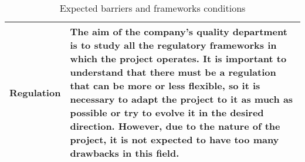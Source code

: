 \begin{table}[H]
\begin{tabular}{l p{12cm}}
		\midrule
		
		Regulation & The aim of the company's quality department is to study all the regulatory frameworks in which the project operates. It is important to understand that there must be a regulation that can be more or less flexible, so it is necessary to adapt the project to it as much as possible or try to evolve it in the desired direction. However, due to the nature of the project, it is not expected to have too many drawbacks in this field.\vspace{0.2cm}\\
		
		
		\bottomrule[2pt]
		
	\end{tabular}
	\caption{Expected barriers and frameworks conditions}
\end{table}